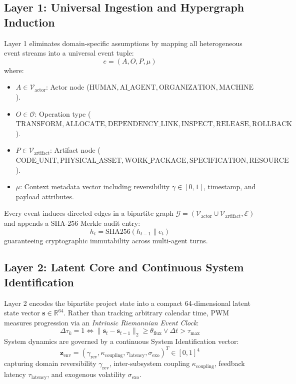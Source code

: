 \documentclass[11pt,a4paper]{article}
\begin{document}
\subsection{Layer 1: Universal Ingestion and Hypergraph Induction}
Layer 1 eliminates domain-specific assumptions by mapping all heterogeneous event streams into a universal event tuple:
\begin{equation}
    e = \left(A, O, P, \mu\right)
\end{equation}
where:
\begin{itemize}
    \item $A \in \mathcal{V}_{\text{actor}}$: Actor node ($\text{HUMAN}, \text{AI\_AGENT}, \text{ORGANIZATION}, \text{MACHINE}$).
    \item $O \in \mathcal{O}$: Operation type ($\text{TRANSFORM}, \text{ALLOCATE}, \text{DEPENDENCY\_LINK}, \text{INSPECT}, \text{RELEASE}, \text{ROLLBACK}$).
    \item $P \in \mathcal{V}_{\text{artifact}}$: Artifact node ($\text{CODE\_UNIT}, \text{PHYSICAL\_ASSET}, \text{WORK\_PACKAGE}, \text{SPECIFICATION}, \text{RESOURCE}$).
    \item $\mu$: Context metadata vector including reversibility $\gamma \in [0, 1]$, timestamp, and payload attributes.
\end{itemize}

Every event induces directed edges in a bipartite graph $\mathcal{G} = (\mathcal{V}_{\text{actor}} \cup \mathcal{V}_{\text{artifact}}, \mathcal{E})$ and appends a SHA-256 Merkle audit entry:
\begin{equation}
    h_t = \text{SHA256}(h_{t-1} \parallel e_t)
\end{equation}
guaranteeing cryptographic immutability across multi-agent turns.

\subsection{Layer 2: Latent Core and Continuous System Identification}
Layer 2 encodes the bipartite project state into a compact 64-dimensional latent state vector $\mathbf{s} \in \mathbb{R}^{64}$. Rather than tracking arbitrary calendar time, PWM measures progression via an \emph{Intrinsic Riemannian Event Clock}:
\begin{equation}
    \Delta \tau_k = 1 \iff \|\mathbf{s}_t - \mathbf{s}_{t-1}\|_2 \ge \theta_{\text{flux}} \lor \Delta t > \tau_{\max}
\end{equation}
System dynamics are governed by a continuous System Identification vector:
\begin{equation}
    \mathbf{z}_{\text{env}} = \left(\gamma_{\text{rev}}, \kappa_{\text{coupling}}, \tau_{\text{latency}}, \sigma_{\text{exo}}\right)^T \in [0, 1]^4
\end{equation}
capturing domain reversibility $\gamma_{\text{rev}}$, inter-subsystem coupling $\kappa_{\text{coupling}}$, feedback latency $\tau_{\text{latency}}$, and exogenous volatility $\sigma_{\text{exo}}$.
\end{document}
